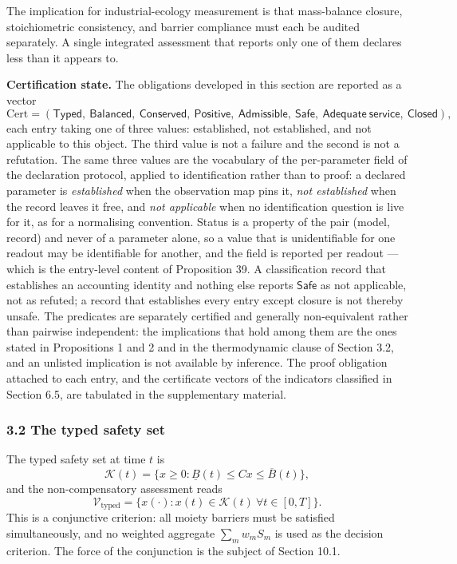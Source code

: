 \documentclass[11pt]{article}
\begin{document}
The implication for industrial-ecology measurement is that mass-balance
closure, stoichiometric consistency, and barrier compliance must each be
audited separately. A single integrated assessment that reports only one
of them declares less than it appears to.

\textbf{Certification state.} The obligations developed in this section are reported as a vector
\[ \mathrm{Cert}=(\mathsf{Typed},\ \mathsf{Balanced},\ \mathsf{Conserved},\ \mathsf{Positive},\ \mathsf{Admissible},\ \mathsf{Safe},\ \mathsf{Adequate\ service},\ \mathsf{Closed}), \]
each entry taking one of three values: established, not established, and not applicable to this
object. The third value is not a failure and the second is not a refutation. The same three values are the
vocabulary of the per-parameter field of the declaration protocol, applied to identification rather than to
proof: a declared parameter is \emph{established} when the observation map pins it, \emph{not established} when the
record leaves it free, and \emph{not applicable} when no identification question is live for it, as for a
normalising convention. Status is a property of the pair (model, record) and never of a parameter alone, so a
value that is unidentifiable for one readout may be identifiable for another, and the field is reported per
readout --- which is the entry-level content of Proposition 39. A classification record
that establishes an accounting identity and nothing else reports \(\mathsf{Safe}\) as not applicable,
not as refuted; a record that establishes every entry except closure is not thereby unsafe. The
predicates are separately certified and generally non-equivalent rather than pairwise independent:
the implications that hold among them are the ones stated in Propositions 1 and 2 and in the
thermodynamic clause of Section 3.2, and an unlisted implication is not available by inference. The
proof obligation attached to each entry, and the certificate vectors of the indicators classified in
Section 6.5, are tabulated in the supplementary material.


\subsubsection{3.2 The typed safety set}\label{the-typed-safety-set}

The typed safety set at time \(t\) is
\[\mathcal{K}(t) = \{ x \ge 0 : \underline{B}(t) \le Cx \le \overline{B}(t) \},\]
and the non-compensatory assessment reads
\[\mathcal{V}_{\mathrm{typed}} = \{ x(\cdot) : x(t) \in \mathcal{K}(t)\ \forall t \in [0,T] \}.\]
This is a conjunctive criterion: all moiety barriers must be satisfied
simultaneously, and no weighted aggregate \(\sum_m w_m S_m\) is used as
the decision criterion. The force of the conjunction is the subject of
Section 10.1.
\end{document}
